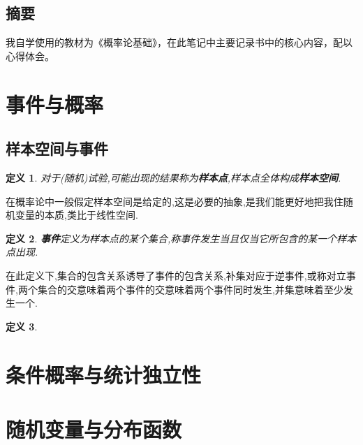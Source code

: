 \documentclass[12pt,a4paper]{article}
\newtheorem{definition}{定义}[subsection] %
\begin{document}
\begin{center}
\section*{摘要}
\end{center}

我自学使用的教材为《概率论基础》，在此笔记中主要记录书中的核心内容，配以心得体会。


{\centering\tableofcontents}

\newpage
\section{事件与概率}
\subsection{样本空间与事件}

\begin{definition}
    对于(随机)试验,可能出现的结果称为\textbf{样本点},样本点全体构成\textbf{样本空间}.
\end{definition}
在概率论中一般假定样本空间是给定的,这是必要的抽象,是我们能更好地把我住随机变量的本质,类比于线性空间.
\begin{definition}
    \textbf{事件}定义为样本点的某个集合,称事件发生当且仅当它所包含的某一个样本点出现.
\end{definition}
在此定义下,集合的包含关系诱导了事件的包含关系,补集对应于逆事件,或称对立事件,两个集合的交意味着两个事件的交意味着两个事件同时发生,并集意味着至少发生一个.
\begin{definition}
    
\end{definition}
\newpage
\section{条件概率与统计独立性}
\subsection{}
\subsection{}


\newpage
\section{随机变量与分布函数}
\subsection{}
\subsection{}
\end{document}
